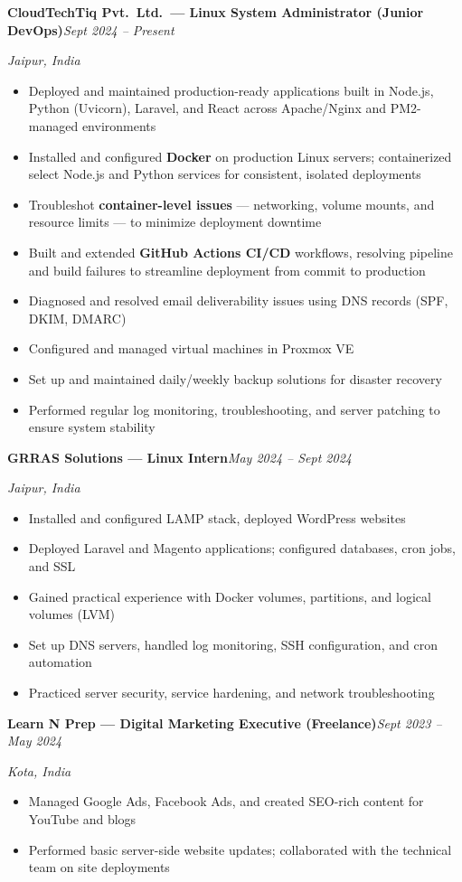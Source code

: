 \documentclass[11pt,a4paper]{article}
\newcommand{\role}[2]{%
  \noindent\textbf{#1}\hfill\textit{\textcolor{midgray}{#2}}\par\vspace{1pt}
}
\newcommand{\subline}[1]{%
  \noindent\textit{\textcolor{midgray}{#1}}\par\vspace{2pt}
}
\begin{document}
\role{CloudTechTiq Pvt.\ Ltd.\ --- Linux System Administrator (Junior DevOps)}{Sept 2024 -- Present}
\subline{Jaipur, India}
\begin{itemize}
  \item Deployed and maintained production-ready applications built in Node.js, Python (Uvicorn), Laravel, and React across Apache/Nginx and PM2-managed environments
  \item Installed and configured \textbf{Docker} on production Linux servers; containerized select Node.js and Python services for consistent, isolated deployments
  \item Troubleshot \textbf{container-level issues} --- networking, volume mounts, and resource limits --- to minimize deployment downtime
  \item Built and extended \textbf{GitHub Actions CI/CD} workflows, resolving pipeline and build failures to streamline deployment from commit to production
  \item Diagnosed and resolved email deliverability issues using DNS records (SPF, DKIM, DMARC)
  \item Configured and managed virtual machines in Proxmox VE
  \item Set up and maintained daily/weekly backup solutions for disaster recovery
  \item Performed regular log monitoring, troubleshooting, and server patching to ensure system stability
\end{itemize}

\role{GRRAS Solutions --- Linux Intern}{May 2024 -- Sept 2024}
\subline{Jaipur, India}
\begin{itemize}
  \item Installed and configured LAMP stack, deployed WordPress websites
  \item Deployed Laravel and Magento applications; configured databases, cron jobs, and SSL
  \item Gained practical experience with Docker volumes, partitions, and logical volumes (LVM)
  \item Set up DNS servers, handled log monitoring, SSH configuration, and cron automation
  \item Practiced server security, service hardening, and network troubleshooting
\end{itemize}

\role{Learn N Prep --- Digital Marketing Executive (Freelance)}{Sept 2023 -- May 2024}
\subline{Kota, India}
\begin{itemize}
  \item Managed Google Ads, Facebook Ads, and created SEO-rich content for YouTube and blogs
  \item Performed basic server-side website updates; collaborated with the technical team on site deployments
\end{itemize}
\end{document}
